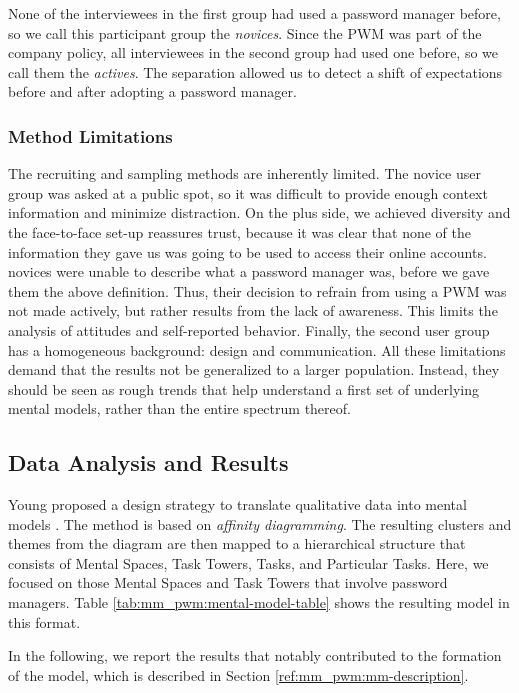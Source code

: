 None of the interviewees in the first group had used a password manager before, so we call this participant group the \textit{novices}. Since the \gls{PWM} was part of the company policy, all interviewees in the second group had used one before, so we call them the \textit{actives}. The separation allowed us to detect a shift of expectations before and after adopting a password manager. 

\subsubsection{Method Limitations}
The recruiting and sampling methods are inherently limited. The novice user group was asked at a public spot, so it was difficult to provide enough context information and minimize distraction. On the plus side, we achieved diversity and the face-to-face set-up reassures trust, because it was clear that none of the information they gave us was going to be used to access their online accounts.  novices were unable to describe what a password manager was, before we gave them the above definition. Thus, their decision to refrain from using a \gls{PWM} was not made actively, but rather results from the lack of awareness. This limits the analysis of attitudes and self-reported behavior. Finally, the second user group has a homogeneous background: design and communication. All these limitations demand that the results not be generalized to a larger population. Instead, they should be seen as rough trends that help understand a first set of underlying mental models, rather than the entire spectrum thereof.

\subsection{Data Analysis and Results}
Young proposed a design strategy to translate qualitative data into mental models \cite{Young2008}. The method is based on \textit{affinity diagramming}. The resulting clusters and themes from the diagram are then mapped to a hierarchical structure that consists of Mental Spaces, Task Towers, Tasks, and Particular Tasks. Here, we focused on those Mental Spaces and Task Towers that involve password managers. Table \ref{tab:mm_pwm:mental-model-table} shows the resulting model in this format. 


In the following, we report the results that notably contributed to the formation of the model, which is described in Section \ref{ref:mm_pwm:mm-description}.

